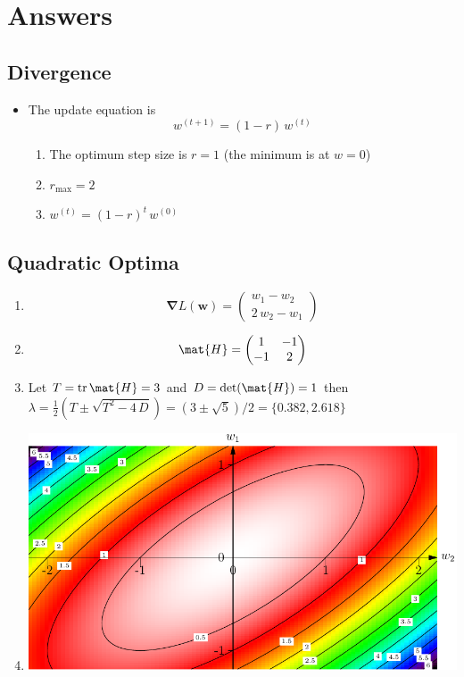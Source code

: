 \documentclass[11pt]{article}
\newcommand{\grad}{\bm{\nabla}}
\begin{document}
\section{Answers}
\label{sec:orgf2ff033}

\subsection{Divergence}
\label{sec:orgf964309}
\begin{itemize}
\item The update equation is 
$$ w^{(t+1)} = (1-r) \, w^{(t)} $$
\begin{enumerate}
\item The optimum step size is \(r=1\) (the minimum is at \(w=0\))
\item \(r_{\max}=2\)
\item \(w^{(t)} = (1-r)^t \, w^{(0)}\)
\end{enumerate}
\end{itemize}

\subsection{Quadratic Optima}
\label{sec:org11273ec}
\begin{enumerate}
\item $$ \grad L(\bm{w}) = \begin{pmatrix} w_1 - w_2 \\ 2\,w_2 - w_1 \end{pmatrix} $$
\item $$ \mat{H} = \begin{pmatrix} 1 & -1\\ -1 & 2 \end{pmatrix} $$
\item Let \(T = \mathrm{tr}\, \mat{H} =3\) and \(D = \det(\mat{H}) = 1\) then
\(\lambda = \tfrac{1}{2} \left(T \pm \sqrt{T^2-4\,D}\right) =
      (3\pm\sqrt{5})/2 = \{0.382, 2.618\}\)
\item \begin{center}
\includegraphics[width=.9\linewidth]{./figures/quadProblem.pdf}
\end{center}
\end{enumerate}
\end{document}
